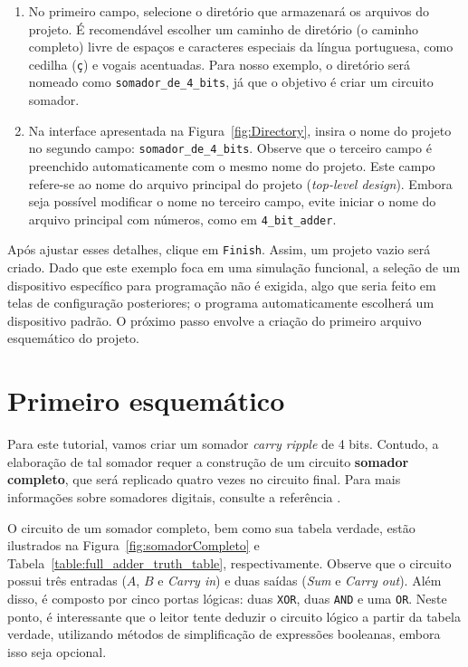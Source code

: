 \documentclass[12pt,a4paper]{article}
\begin{document}
\begin{enumerate}
    \item No primeiro campo, selecione o diretório que armazenará os arquivos do projeto. É recomendável escolher um caminho de diretório (o caminho completo) livre de espaços e caracteres especiais da língua portuguesa, como cedilha (\texttt{\c{c}}) e vogais acentuadas. Para nosso exemplo, o diretório será nomeado como \texttt{somador\_de\_4\_bits}, já que o objetivo é criar um circuito somador.
    
    \item Na interface apresentada na Figura~\ref{fig:Directory}, insira o nome do projeto no segundo campo: \texttt{somador\_de\_4\_bits}. Observe que o terceiro campo é preenchido automaticamente com o mesmo nome do projeto. Este campo refere-se ao nome do arquivo principal do projeto (\textit{top-level design}). Embora seja possível modificar o nome no terceiro campo, evite iniciar o nome do arquivo principal com números, como em \texttt{4\_bit\_adder}. 
\end{enumerate}

Após ajustar esses detalhes, clique em \texttt{Finish}. Assim, um projeto vazio será criado. Dado que este exemplo foca em uma simulação funcional, a seleção de um dispositivo específico para programação não é exigida, algo que seria feito em telas de configuração posteriores; o programa automaticamente escolherá um dispositivo padrão. O próximo passo envolve a criação do primeiro arquivo esquemático do projeto.

\section{Primeiro esquemático}

Para este tutorial, vamos criar um somador \textit{carry ripple} de 4 bits. Contudo, a elaboração de tal somador requer a construção de um circuito \textbf{somador completo}, que será replicado quatro vezes no circuito final. Para mais informações sobre somadores digitais, consulte a referência \cite{Tocci2007SistemasDigitais}. 

O circuito de um somador completo, bem como sua tabela verdade, estão ilustrados na Figura~\ref{fig:somadorCompleto} e Tabela~\ref{table:full_adder_truth_table}, respectivamente. Observe que o circuito possui três entradas ($A$, $B$ e \textit{Carry in}) e duas saídas (\textit{Sum} e \textit{Carry out}). Além disso, é composto por cinco portas lógicas: duas \texttt{XOR}, duas \texttt{AND} e uma \texttt{OR}. Neste ponto, é interessante que o leitor tente deduzir o circuito lógico a partir da tabela verdade, utilizando métodos de simplificação de expressões booleanas, embora isso seja opcional.
\end{document}
